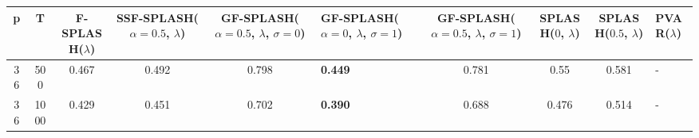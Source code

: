 \begin{tabular}{ccccclcccl}
\hline
  p  &  T   &  F-SPLASH($\lambda$)  &  SSF-SPLASH($\alpha=0.5$, $\lambda$)  &  GF-SPLASH($\alpha=0.5$, $\lambda$, $\sigma=0$)  & GF-SPLASH($\alpha=0$, $\lambda$, $\sigma=1$)   &  GF-SPLASH($\alpha=0.5$, $\lambda$, $\sigma=1$)  &  SPLASH($0$, $\lambda$)  &  SPLASH($0.5$, $\lambda$)  & PVAR($\lambda$)   \\
\hline
 36  & 500  &         0.467         &                 0.492                 &                      0.798                       & \textbf{0.449}                                 &                      0.781                       &           0.55           &           0.581            & -                 \\
 36  & 1000 &         0.429         &                 0.451                 &                      0.702                       & \textbf{0.390}                                 &                      0.688                       &          0.476           &           0.514            & -                 \\
\hline
\end{tabular}